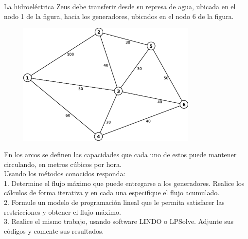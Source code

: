 La hidroeléctrica Zeus debe transferir desde su represa de agua, ubicada en el nodo 1 de la figura, hacia los generadores, ubicados en el nodo 6 de la figura.

\begin{figure} [h]
\begin {center}
\includegraphics[width=0.8\textwidth]{images/figura.eps}
\end {center}
\end{figure}


En los arcos se definen las capacidades que cada uno de estos puede mantener circulando, en
metros cúbicos por hora.\\

Usando los métodos conocidos responda:\\

1. Determine el flujo máximo que puede entregarse a los generadores. Realice los cálculos de 
\hspace*{0.9cm}forma iterativa y en cada una especifique el flujo acumulado.\\

2. Formule un modelo de programación lineal que le permita satisfacer las restricciones y obtener 
\hspace*{0.9cm}el flujo máximo.\\

3. Realice el mismo trabajo, usando software LINDO o LPSolve. Adjunte sus códigos y comente
\hspace*{0.9cm}sus resultados.\\
